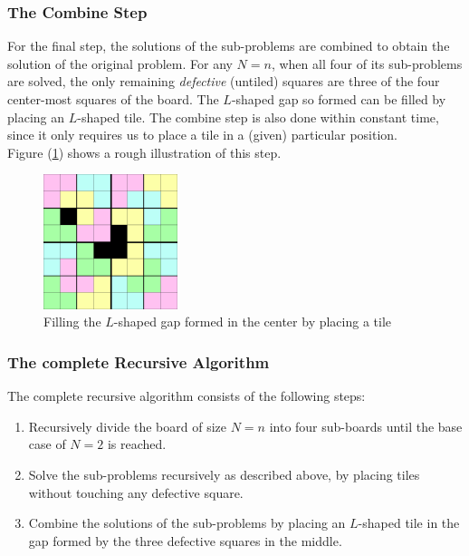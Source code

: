 \documentclass[12pt]{report}
\begin{document}
    \subsubsection*{The Combine Step}
    For the final step, the solutions of the sub-problems are combined to obtain the solution of the original problem.
    For any $N = n$, when all four of its sub-problems are solved, the only remaining \textit{defective} (untiled) squares are
    three of the four center-most squares of the board.
    The $L$-shaped gap so formed can be filled by placing an $L$-shaped tile.
    The combine step is also done within constant time, since it only requires us to place a tile in a (given) particular position.
    \vspace*{10pt} \\
    Figure (\ref{fig:combine}) shows a rough illustration of this step.
    \vspace*{10pt}
    \begin{figure}[htp]
        \begin{center}
            \includegraphics[width=0.35\textwidth]{combine.png}
        \end{center}
        \caption{Filling the $L$-shaped gap formed in the center by placing a tile}
        \label{fig:combine}
    \end{figure}

    \subsubsection*{The complete Recursive Algorithm}
    The complete recursive algorithm consists of the following steps:
    \begin{enumerate}
        \item Recursively divide the board of size $N = n$ into four sub-boards until the base case of $N = 2$ is reached.
        \item Solve the sub-problems recursively as described above, by placing tiles without touching any defective square.
        \item Combine the solutions of the sub-problems by placing an $L$-shaped tile in the gap formed by the three defective squares in the middle.
    \end{enumerate}
\end{document}
